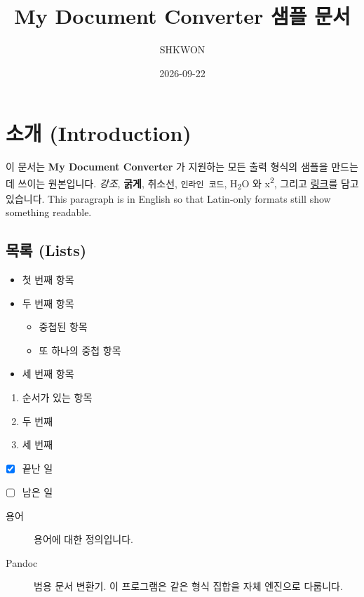 \documentclass[11pt]{article}
\title{My Document Converter 샘플 문서}
\author{SHKWON}
\date{2026-09-22}
\begin{document}
\maketitle

\section*{소개 (Introduction)}\label{소개-introduction}

이 문서는 \textbf{My Document Converter} 가 지원하는 모든 출력 형식의 샘플을 만드는 데 쓰이는
원본입니다.
\emph{강조}, \textbf{굵게}, 취소선, \verb|인라인 코드|, H\textsubscript{2}O 와
x\textsuperscript{2}, 그리고
\href{https://example.com}{링크}를 담고 있습니다. This paragraph is in
English so that Latin-only formats still show something readable.

\subsection*{목록 (Lists)}\label{목록-lists}

\begin{itemize}
\item 첫 번째 항목
\item 두 번째 항목
\begin{itemize}
\item 중첩된 항목
\item 또 하나의 중첩 항목
\end{itemize}
\item 세 번째 항목
\end{itemize}

\begin{enumerate}
\item 순서가 있는 항목
\item 두 번째
\item 세 번째
\end{enumerate}

\begin{itemize}
\item ☒ 끝난 일
\item ☐ 남은 일
\end{itemize}

\begin{description}
\item[용어] 용어에 대한 정의입니다.
\item[Pandoc] 범용 문서 변환기. 이 프로그램은 같은 형식 집합을 자체 엔진으로 다룹니다.
\end{description}
\end{document}
